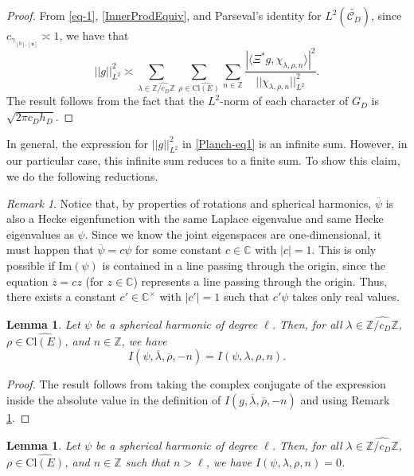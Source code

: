 \documentclass[11pt]{amsart}
\newcommand{\Z}{\mathbb{Z}}
\newcommand{\C}{\mathbb{C}}
\renewcommand{\a}{\mathfrak{a}}
\newtheorem{lemma}[theorem]{Lemma}
\theoremstyle{definition}
\theoremstyle{remark}
\newtheorem{remark}[theorem]{Remark}
\begin{document}
\begin{proof}
From \eqref{eq-1}, \eqref{InnerProdEquiv}, and Parseval's identity for $L^2(\widetilde{\mathcal{C}_{D}})$, since $c_{\gamma_{[b], [\a]}} \asymp 1$, we have that $$ ||g||_{L^2}^{2} \asymp \sum_{\lambda \in \widehat{\Z/c_D \Z}} \sum_{\rho \in \widehat{\mathrm{Cl}(E)}} \sum_{n\in \Z} \frac{|\langle \Xi^{*}g, \chi_{\lambda, \rho,n}\rangle|^2}{||\chi_{\lambda,\rho,n}||_{L^2}^{2}}.$$ The result follows from the fact that the $L^2$-norm of each character of $G_D$ is $\sqrt{2\pi c_D h_D}$.
\end{proof}

In general, the expression for $||g||_{L^2}^{2}$ in \eqref{Planch-eq1} is an infinite sum. However, in our particular case, this infinite sum reduces to a finite sum. To show this claim, we do the following reductions.

\begin{remark}\label{PsiRealValued}
Notice that, by properties of rotations and spherical harmonics, $\overline{\psi}$ is also a Hecke eigenfunction with the same Laplace eigenvalue and same Hecke eigenvalues as $\psi$. Since we know the joint eigenspaces are one-dimensional, it must happen that $\overline{\psi} = c \psi$ for some constant $c\in \C$ with $|c|=1$. This is only possible if $\mathrm{Im}(\psi)$ is contained in a line passing through the origin, since the equation $\overline{z}=cz$ (for $z\in \C$) represents a line passing through the origin. Thus, there exists a constant $c'\in \C^{\times}$ with $|c'|=1$ such that $c' \psi$ takes only real values.
\end{remark}

\begin{lemma}
Let $\psi$ be a spherical harmonic of degree $\ell$. Then, for all $\lambda\in \widehat{\Z/c_D \Z}$, $\rho\in \widehat{\mathrm{Cl}(E)}$, and $n\in \Z$, we have $$I(\psi,\overline{\lambda}, \overline{\rho},-n) = I(\psi,\lambda, \rho, n).$$
\end{lemma}

\begin{proof}
The result follows from taking the complex conjugate of the expression inside the absolute value in the definition of $I(g,\overline{\lambda}, \overline{\rho}, -n)$ and using Remark \ref{PsiRealValued}.
\end{proof}

\begin{lemma}\label{IntEq0forLargen}
Let $\psi$ be a spherical harmonic of degree $\ell$. Then, for all $\lambda\in \widehat{\Z/c_D \Z}$, $\rho\in \widehat{\mathrm{Cl}(E)}$, and $n\in \Z$ such that $n>\ell$, we have $I(\psi,\lambda, \rho, n)=0$.
\end{lemma}
\end{document}
